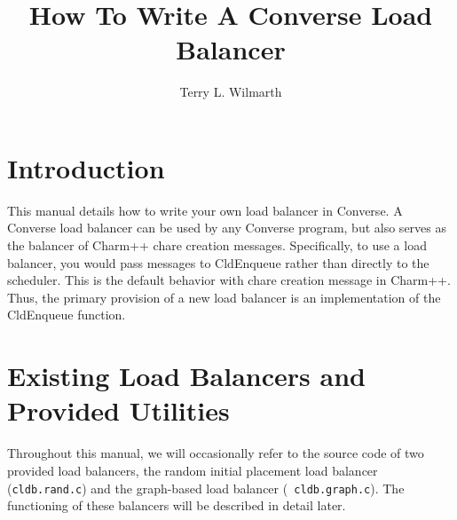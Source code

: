 
\newif\ifpdf
\ifx\pdfoutput\undefined
  \pdffalse
\else
  \pdftrue
\fi

\ifpdf
  \usepackage[pdftex,colorlinks=true,plainpages=false]{hyperref}
\else
\fi

\pagestyle{headings}


%
%

%
%
\newcommand{\zap}[1]{ }
\newcommand{\fcmd}{\bf}		%
\newcommand{\fparm}{\it\sf}	%
\newcommand{\fexec}{\bf}	%
\newcommand{\atitle}[1]{{\it #1}}
\newcommand{\keyword}[1]{{\textbf{#1}}}
\newcommand{\userword}[1]{{\fparm \textsc{#1}}}
\newcommand{\constraint}[1]{Note: {\it #1}}
\newcommand{\note}[1]{Note: {\it #1}}

\title{How To Write A Converse Load Balancer}
\author{Terry L. Wilmarth}



\maketitle

\section{Introduction}

This manual details how to write your own load balancer in Converse.
A Converse load balancer can be used by any Converse program, but also
serves as the balancer of Charm++ chare creation messages.
Specifically, to use a load balancer, you would pass messages to
CldEnqueue rather than directly to the scheduler.  This is the default
behavior with chare creation message in Charm++.  Thus, the primary
provision of a new load balancer is an implementation of the
CldEnqueue function.

\section{Existing Load Balancers and Provided Utilities}

Throughout this manual, we will occasionally refer to the source code
of two provided load balancers, the random initial placement load balancer
({\tt cldb.rand.c}) and the graph-based load balancer ({\tt
cldb.graph.c}).  The functioning of these balancers will be described
in detail later.

